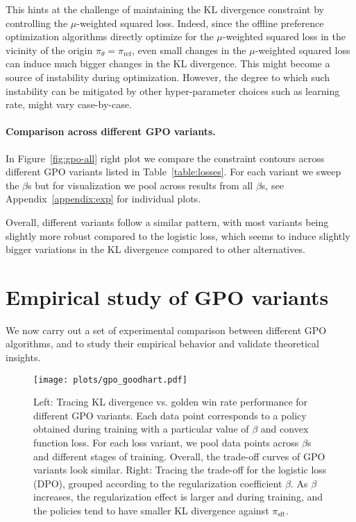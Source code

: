 This hints at the challenge of maintaining the KL divergence constraint by controlling the $\mu$-weighted squared loss. Indeed, since the offline preference optimization algorithms directly optimize for the $\mu$-weighted squared loss in the vicinity of the origin $\pi_\theta=\pi_\text{ref}$, even small changes in the $\mu$-weighted squared loss can induce much bigger changes in the KL divergence. This might become a source of instability during optimization. However, the degree to which such instability can be mitigated by other hyper-parameter choices such as learning rate, might vary case-by-case.

\paragraph{Comparison across different GPO variants.} In Figure~\ref{fig:gpo-all} right plot we compare the constraint contours across different GPO variants listed in Table~\ref{table:losses}. For each variant we sweep the $\beta$s but for visualization we pool across results from all $\beta$s, see Appendix~\ref{appendix:exp} for individual plots. 

Overall, different variants follow a similar pattern, with most variants being slightly more robust compared to the logistic loss, which seems to induce slightly bigger variations in the KL divergence compared to other alternatives.

\section{Empirical study of GPO variants} \label{sec:exp}

We now carry out a set of experimental comparison between different GPO algorithms, and to study their empirical behavior and validate theoretical insights.

\begin{figure*}[t]
    \centering
    \texttt{[image: plots/gpo\_goodhart.pdf]}
    \caption{Left: Tracing KL divergence vs. golden win rate performance for different GPO variants. Each data point corresponds to a policy obtained during training with a particular value of $\beta$ and convex function loss. For each loss variant, we pool data points across $\beta$s and different stages of training. Overall, the trade-off curves of GPO variants look similar. Right: Tracing the trade-off for the logistic loss (DPO), grouped according to the regularization coefficient $\beta$. As $\beta$ increases, the regularization effect is larger and during training, and the policies tend to have smaller KL divergence against $\pi_\text{sft}$.}
    \label{fig:goodhart-all}
\end{figure*}


